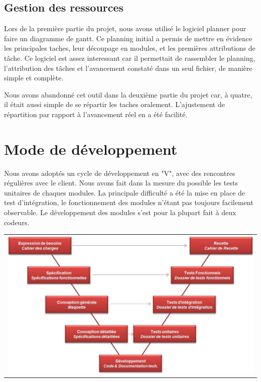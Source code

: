 \subsection{Gestion des ressources}

Lors de la première partie du projet, nous avons utilisé le logiciel planner pour faire un diagramme de gantt. Ce planning initial a permis de mettre en évidence les principales taches, leur découpage en modules, et les premières attributions de tâche. Ce logiciel est assez interessant car il permettait de rassembler le planning, l'attribution des tâches et l'avancement constaté dans un seul fichier, de manière simple et complète. 

Nous avons abandonné cet outil dans la deuxième partie du projet car, à quatre, il était aussi simple de se répartir les taches oralement. L'ajustement de répartition par rapport à l'avancement réel en a été facilité.

\section{Mode de développement}

Nous avons adoptés un cycle de développement en "V", avec des rencontres régulières avec le client. Nous avons fait dans la mesure du possible les tests unitaires de chaques modules. La principale difficulté a été la mise en place de test d'intégration, le fonctionnement des modules n'étant pas toujours facilement observable. Le développement des modules s'est pour la plupart fait à deux codeurs.

\begin{tabular}{c}
\includegraphics[width=140mm]{Images/Cycle_en_V.jpg}
\end{tabular}

